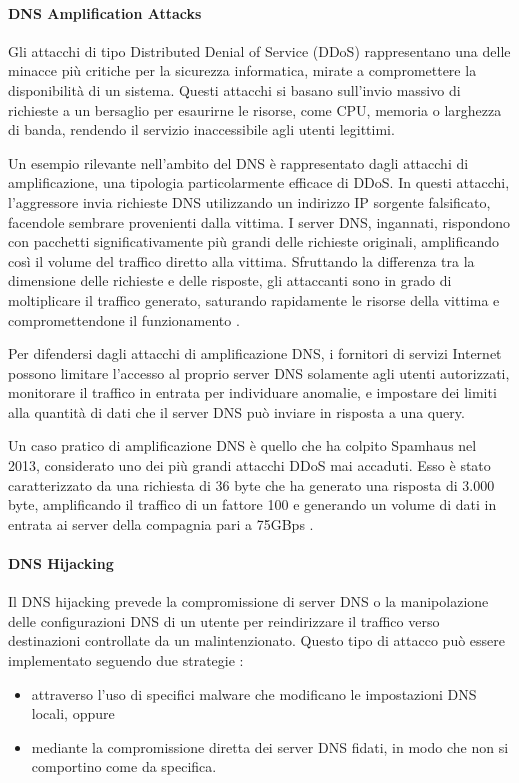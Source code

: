 \paragraph{DNS Amplification Attacks}
Gli attacchi di tipo Distributed Denial of Service (DDoS) rappresentano una delle minacce più critiche per la sicurezza informatica, mirate a compromettere la disponibilità di un sistema. Questi attacchi si basano sull'invio massivo di richieste a un bersaglio per esaurirne le risorse, come CPU, memoria o larghezza di banda, rendendo il servizio inaccessibile agli utenti legittimi.

Un esempio rilevante nell'ambito del DNS è rappresentato dagli attacchi di amplificazione, una tipologia particolarmente efficace di DDoS. In questi attacchi, l'aggressore invia richieste DNS utilizzando un indirizzo IP sorgente falsificato, facendole sembrare provenienti dalla vittima. I server DNS, ingannati, rispondono con pacchetti significativamente più grandi delle richieste originali, amplificando così il volume del traffico diretto alla vittima. Sfruttando la differenza tra la dimensione delle richieste e delle risposte, gli attaccanti sono in grado di moltiplicare il traffico generato, saturando rapidamente le risorse della vittima e compromettendone il funzionamento \cite{Alieyan2016}.

Per difendersi dagli attacchi di amplificazione DNS, i fornitori di servizi Internet possono limitare l'accesso al proprio server DNS solamente agli utenti autorizzati, monitorare il traffico in entrata per individuare anomalie, e impostare dei limiti alla quantità di dati che il server DNS può inviare in risposta a una query.

Un caso pratico di amplificazione DNS è quello che ha colpito Spamhaus nel 2013, considerato uno dei più grandi attacchi DDoS mai accaduti. Esso è stato caratterizzato da una richiesta di 36 byte che ha generato una risposta di 3.000 byte, amplificando il traffico di un fattore 100 e generando un volume di dati in entrata ai server della compagnia pari a 75GBps \cite{Bonasera2021}.

\paragraph{DNS Hijacking}
Il DNS hijacking prevede la compromissione di server DNS o la manipolazione delle configurazioni DNS di un utente per reindirizzare il traffico verso destinazioni controllate da un malintenzionato. Questo tipo di attacco può essere implementato seguendo due strategie \cite{hudaib2014dns}:
\begin{itemize}
  \item attraverso l'uso di specifici malware che modificano le impostazioni DNS locali, oppure
  \item mediante la compromissione diretta dei server DNS fidati, in modo che non si comportino come da specifica.
\end{itemize}

